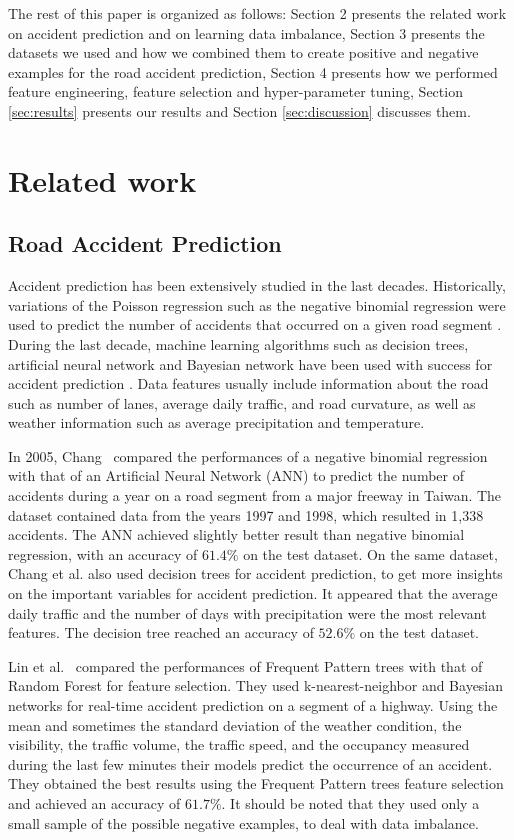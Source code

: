 \documentclass[conference]{IEEEtran}
\begin{document}
The rest of this paper is organized as follows: Section 2 presents
the related work on accident prediction and on learning data imbalance, Section 3 presents the datasets we used and
how we combined them to create positive and negative examples for the road
accident prediction, Section 4 presents how we performed feature
engineering, feature selection and hyper-parameter tuning, Section \ref{sec:results}
presents our results and Section \ref{sec:discussion} discusses them.

\section{Related work}
\subsection{Road Accident Prediction}
Accident prediction has been extensively studied in the last decades.
Historically, variations of the Poisson regression such as the negative
binomial regression were used to predict the number of accidents that
occurred on a given road segment \cite{Milton1998}. During the last decade,
machine learning algorithms such as decision trees, artificial neural network
and Bayesian network have been used with success for accident prediction
\cite{Chang2005, Chang2005b, Lin2015, Theofilatos2017}.
Data features usually include information about the road such as number of
lanes, average daily traffic, and road curvature, as well as weather
information such as average precipitation and temperature. 

In 2005,
Chang~\cite{Chang2005} compared the performances of a negative binomial
regression with that of an Artificial Neural Network (ANN) to predict the number
of accidents during a year on a road segment from a major freeway in
Taiwan. The dataset contained data from the years 1997 and 1998, which
resulted in 1,338 accidents. The ANN achieved slightly better result than negative 
binomial regression, with
an accuracy of $61.4\%$ on the test dataset. On the same dataset, Chang et
al.\cite{Chang2005b} also used decision trees for accident prediction,
 to get more insights on the important variables for accident
prediction. It appeared that the average daily traffic and the number of
days with precipitation were the most relevant features. The decision tree
reached an accuracy of $52.6\%$ on the test dataset. 

Lin et
al.~\cite{Lin2015} compared the performances of Frequent Pattern trees\cite{Han2004} with
that of Random Forest for feature selection. They used k-nearest-neighbor
and Bayesian networks for real-time accident prediction on a segment of
a highway. Using the mean and sometimes the standard deviation of the weather condition, the visibility, the traffic volume, the traffic speed, and the occupancy measured during the last few minutes their models predict the occurrence of an accident. They obtained
the best results using the Frequent Pattern trees feature selection and achieved
an accuracy of $61.7\%$. It should be noted that they used only a small sample of the
possible negative examples, to deal with data imbalance. 
\end{document}
